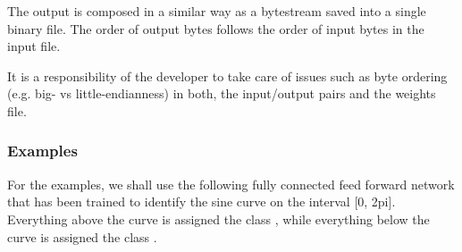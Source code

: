 The output is composed in a similar way as a bytestream saved into a single binary file. The order of output bytes follows the order of input bytes in the input file.

It is a responsibility of the developer to take care of issues such as byte ordering (e.\+g. big-\/ vs little-\/endianness) in both, the input/output pairs and the weights file.

\subsubsection*{Examples}

For the examples, we shall use the following fully connected feed forward network that has been trained to identify the sine curve on the interval {\ttfamily \mbox{[}0, 2pi\mbox{]}}. Everything above the curve is assigned the class {}, while everything below the curve is assigned the class {}.


